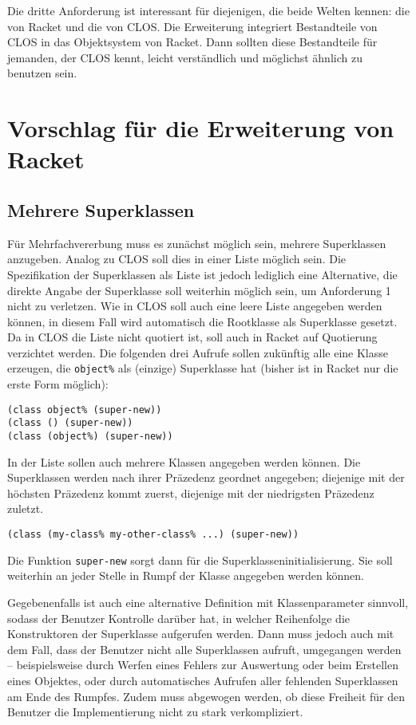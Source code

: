 Die dritte Anforderung ist interessant für diejenigen, die beide Welten kennen: die von Racket und die von CLOS. Die Erweiterung integriert Bestandteile von CLOS in das Objektsystem von Racket. Dann sollten diese Bestandteile für jemanden, der CLOS kennt, leicht verständlich und möglichst ähnlich zu benutzen sein.

\section{Vorschlag für die Erweiterung von Racket}

\subsection{Mehrere Superklassen}
Für Mehrfachvererbung muss es zunächst möglich sein, mehrere Superklassen anzugeben. Analog zu CLOS soll dies in einer Liste möglich sein. Die Spezifikation der Superklassen als Liste ist jedoch lediglich eine Alternative, die direkte Angabe der Superklasse soll weiterhin möglich sein, um Anforderung 1 nicht zu verletzen. Wie in CLOS soll auch eine leere Liste angegeben werden können, in diesem Fall wird automatisch die Rootklasse als Superklasse gesetzt. Da in CLOS die Liste nicht quotiert ist, soll auch in Racket auf Quotierung verzichtet werden. Die folgenden drei Aufrufe sollen zukünftig alle eine Klasse erzeugen, die \texttt{object\%} als (einzige) Superklasse hat (bisher ist in Racket nur die erste Form möglich):

\begin{lstlisting}
(class object% (super-new))
(class () (super-new))
(class (object%) (super-new))
\end{lstlisting}

In der Liste sollen auch mehrere Klassen angegeben werden können. Die Superklassen werden nach ihrer Präzedenz geordnet angegeben; diejenige mit der höchsten Präzedenz kommt zuerst, diejenige mit der niedrigsten Präzedenz zuletzt. 

\begin{lstlisting}
(class (my-class% my-other-class% ...) (super-new)) 
\end{lstlisting}

Die Funktion \texttt{super-new} sorgt dann für die Superklasseninitialisierung. Sie soll weiterhin an jeder Stelle in Rumpf der Klasse angegeben werden können. 

Gegebenenfalls ist auch eine alternative Definition mit Klassenparameter sinnvoll, sodass der Benutzer Kontrolle darüber hat, in welcher Reihenfolge die Konstruktoren der Superklasse aufgerufen werden. Dann muss jedoch auch mit dem Fall, dass der Benutzer nicht alle Superklassen aufruft, umgegangen werden -- beispielsweise durch Werfen eines Fehlers zur Auswertung oder beim Erstellen eines Objektes, oder durch automatisches Aufrufen aller fehlenden Superklassen am Ende des Rumpfes. Zudem muss abgewogen werden, ob diese Freiheit für den Benutzer die Implementierung nicht zu stark verkompliziert.

